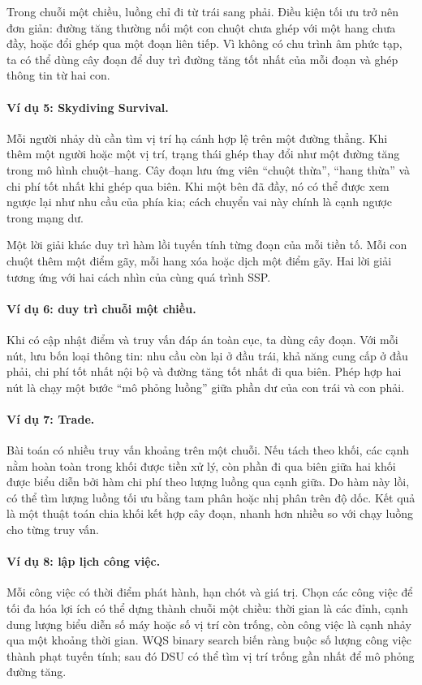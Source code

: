 \documentclass[11pt]{article}
\begin{document}
Trong chuỗi một chiều, luồng chỉ đi từ trái sang phải. Điều kiện tối ưu trở nên
đơn giản: đường tăng thường nối một con chuột chưa ghép với một hang chưa đầy,
hoặc đổi ghép qua một đoạn liên tiếp. Vì không có chu trình âm phức tạp, ta có
thể dùng cây đoạn để duy trì đường tăng tốt nhất của mỗi đoạn và ghép thông tin
từ hai con.

\paragraph{Ví dụ 5: Skydiving Survival.}
Mỗi người nhảy dù cần tìm vị trí hạ cánh hợp lệ trên một đường thẳng. Khi thêm
một người hoặc một vị trí, trạng thái ghép thay đổi như một đường tăng trong mô
hình chuột--hang. Cây đoạn lưu ứng viên ``chuột thừa'', ``hang thừa'' và chi phí
tốt nhất khi ghép qua biên. Khi một bên đã đầy, nó có thể được xem ngược lại
như nhu cầu của phía kia; cách chuyển vai này chính là cạnh ngược trong mạng dư.

Một lời giải khác duy trì hàm lồi tuyến tính từng đoạn của mỗi tiền tố. Mỗi con
chuột thêm một điểm gãy, mỗi hang xóa hoặc dịch một điểm gãy. Hai lời giải tương
ứng với hai cách nhìn của cùng quá trình SSP.

\paragraph{Ví dụ 6: duy trì chuỗi một chiều.}
Khi có cập nhật điểm và truy vấn đáp án toàn cục, ta dùng cây đoạn. Với mỗi nút,
lưu bốn loại thông tin: nhu cầu còn lại ở đầu trái, khả năng cung cấp ở đầu
phải, chi phí tốt nhất nội bộ và đường tăng tốt nhất đi qua biên. Phép hợp hai
nút là chạy một bước ``mô phỏng luồng'' giữa phần dư của con trái và con phải.

\paragraph{Ví dụ 7: Trade.}
Bài toán có nhiều truy vấn khoảng trên một chuỗi. Nếu tách theo khối, các cạnh
nằm hoàn toàn trong khối được tiền xử lý, còn phần đi qua biên giữa hai khối
được biểu diễn bởi hàm chi phí theo lượng luồng qua cạnh giữa. Do hàm này lồi,
có thể tìm lượng luồng tối ưu bằng tam phân hoặc nhị phân trên độ dốc. Kết quả
là một thuật toán chia khối kết hợp cây đoạn, nhanh hơn nhiều so với chạy luồng
cho từng truy vấn.

\paragraph{Ví dụ 8: lập lịch công việc.}
Mỗi công việc có thời điểm phát hành, hạn chót và giá trị. Chọn các công việc
để tối đa hóa lợi ích có thể dựng thành chuỗi một chiều: thời gian là các đỉnh,
cạnh dung lượng biểu diễn số máy hoặc số vị trí còn trống, còn công việc là
cạnh nhảy qua một khoảng thời gian. WQS binary search biến ràng buộc số lượng
công việc thành phạt tuyến tính; sau đó DSU có thể tìm vị trí trống gần nhất để
mô phỏng đường tăng.
\end{document}
